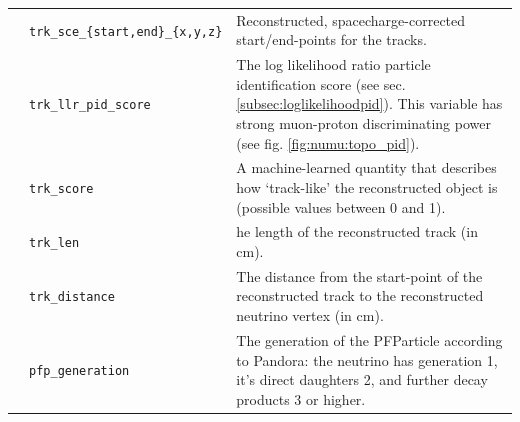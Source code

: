 \begin{table}[ht]
\begin{tabular}{ m{} | m{} | m{}  }
\multicolumn{1}{l|}{} & \texttt{trk\_sce\_\{start,end\}\_\{x,y,z\}} &  Reconstructed, spacecharge-corrected start/end-points for the tracks.\\  \cline{2-3}
\multicolumn{1}{l|}{} & \texttt{trk\_llr\_pid\_score} &  The log likelihood ratio particle identification score (see sec. \ref{subsec:loglikelihoodpid}). This variable has strong muon-proton discriminating power (see fig. \ref{fig:numu:topo_pid}).\\  \cline{2-3}
\multicolumn{1}{l|}{} & \texttt{trk\_score} & A machine-learned quantity that describes how `track-like' the reconstructed object is (possible values between 0 and 1). \\  \cline{2-3}
\parbox[t]{2mm}{} & \texttt{trk\_len} & he length of the reconstructed track (in cm). \\  
 & \texttt{trk\_distance} & The distance from the start-point of the reconstructed track to the reconstructed neutrino vertex (in cm). \\  
 & \texttt{pfp\_generation} &  The generation of the PFParticle according to Pandora: the neutrino has generation 1, it's direct daughters 2, and further decay products 3 or higher.\\  
\hline

\end{tabular}
\label{tab:numuvariableSummary}
\end{table}

